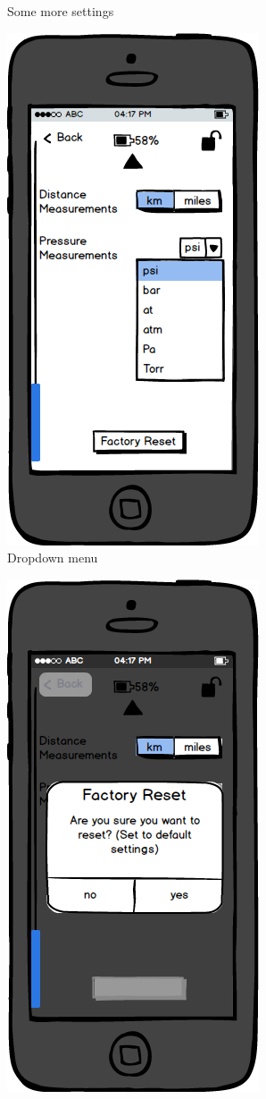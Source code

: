 \documentclass[a4paper]{report}
\begin{document}
{\begin{figure}
\caption{Some more settings}
\end{figure}
\clearpage
\begin{figure}
\centering
\includegraphics[scale=0.9]{figures/prototype_1/settings_2_check}
\caption{Dropdown menu}
\end{figure}
\clearpage
\begin{figure}
\centering
\includegraphics[scale=0.9]{figures/prototype_1/factory_settings}

\end{figure}}
\end{document}

